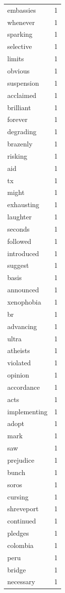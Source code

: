 \begin{tabular}{lr}
embassies & 1 \\
whenever & 1 \\
sparking & 1 \\
selective & 1 \\
limits & 1 \\
obvious & 1 \\
suspension & 1 \\
acclaimed & 1 \\
brilliant & 1 \\
forever & 1 \\
degrading & 1 \\
brazenly & 1 \\
risking & 1 \\
aid & 1 \\
tx & 1 \\
might & 1 \\
exhausting & 1 \\
laughter & 1 \\
seconds & 1 \\
followed & 1 \\
introduced & 1 \\
suggest & 1 \\
basis & 1 \\
announced & 1 \\
xenophobia & 1 \\
br & 1 \\
advancing & 1 \\
ultra & 1 \\
atheists & 1 \\
violated & 1 \\
opinion & 1 \\
accordance & 1 \\
acts & 1 \\
implementing & 1 \\
adopt & 1 \\
mark & 1 \\
saw & 1 \\
prejudice & 1 \\
bunch & 1 \\
soros & 1 \\
cursing & 1 \\
shreveport & 1 \\
continued & 1 \\
pledges & 1 \\
colombia & 1 \\
peru & 1 \\
bridge & 1 \\
necessary & 1 \\

\end{tabular}
